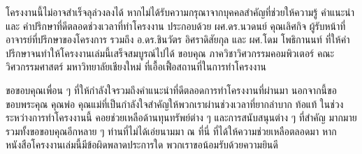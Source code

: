 \begin{acknowledgments}
  
\quad\quad โครงงานนี้ไม่อาจสำเร็จลุล่วงลงได้ หากไม่ได้รับความกรุณาจากบุคคลสำคัญที่ช่วยให้ความรู้ 
คำแนะนำ และ คำปรึกษาที่ดีตลอดช่วงเวลาที่ทำโครงงาน ประกอบด้วย ผศ.ดร.นวดนย์ คุณเลิศกิจ ผู้รับหน้าที่อาจารย์ที่ปรึกษาของโครงการ รวมถึง 
อ.ดร.ชินวัตร อิศราดิสัยกุล และ ผศ.โดม โพธิกานนท์ ที่ให้คำปรึกษาจนทำให้โครงงานเล่มนี้เสร็จสมบูรณ์ไปได้ 
ขอบคุณ ภาควิชาวิศวกรรมคอมพิวเตอร์ คณะวิศวกรรมศาสตร์ มหาวิทยาลัยเชียงใหม่ ที่เอื้อเฟื้อสถานที่ในการทำโครงงาน 

ขอขอบคุณเพื่อน ๆ ที่ให้กำลังใจรวมถึงคำแนะนำที่ดีตลอดการทำโครงงานที่ผ่านมา
นอกจากนี้ขอขอบพระคุณ คุณพ่อ คุณแม่ที่เป็นกำลังใจสำคัญให้พวกเราผ่านช่วงเวลาที่ยากลำบาก ท้อแท้
ในช่วงระหว่างการทำโครงงานนี้ คอยช่วยเหลือด้านทุนทรัพย์ต่าง ๆ และการสนับสนุนต่าง ๆ ที่สำคัญ
มากมาย รวมทั้งขอขอบคุณอีกหลาย ๆ ท่านที่ไม่ได้เอ่ยนามมา ณ ที่นี่ ที่ได้ให้ความช่วยเหลือตลอดมา
หากหนังสือโครงงานเล่มนี้มีข้อผิดพลาดประการใด พวกเราขอน้อมรับด้วยความยินดี

\end{acknowledgments}%
\fi %

\contentspage

\ifproject
\figurelistpage
\fi %



